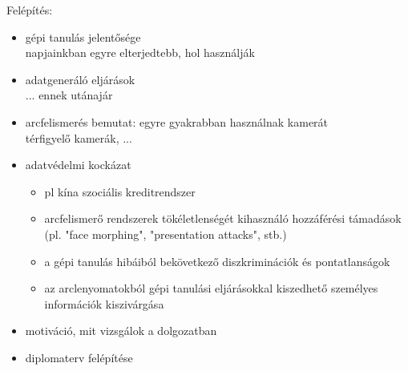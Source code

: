 \newpage
Felépítés:
\begin{itemize}
	\item gépi tanulás jelentősége \\ napjainkban egyre elterjedtebb, hol használják
	\item adatgeneráló eljárások \\ ... ennek utánajár
	\item arcfelismerés bemutat: egyre gyakrabban használnak kamerát \\ térfigyelő kamerák, ...
	\item adatvédelmi kockázat
	\begin{itemize}
		\item pl kína szociális kreditrendszer
		\item  arcfelismerő rendszerek tökéletlenségét kihasználó hozzáférési támadások (pl. "face morphing", "presentation attacks", stb.)
		\item a gépi tanulás hibáiból bekövetkező diszkriminációk és pontatlanságok
		\item az arclenyomatokból gépi tanulási eljárásokkal kiszedhető személyes információk kiszivárgása
	\end{itemize}
	\item motiváció, mit vizsgálok a dolgozatban
	\item diplomaterv felépítése
\end{itemize}

